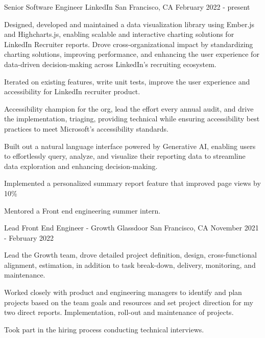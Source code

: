 

\begin{cventries}

  \cventry
    {Senior Software Engineer} %
    {LinkedIn} %
    {San Francisco, CA} %
    {February 2022 - present} %
    {
      \begin{cvitems} %
        \item {Designed, developed and maintained a data visualization library using Ember.js and Highcharts.js, enabling scalable and interactive charting solutions for LinkedIn Recruiter reports. Drove cross-organizational impact by standardizing charting solutions, improving performance, and enhancing the user experience for data-driven decision-making across LinkedIn’s recruiting ecosystem.}
        \item {Iterated on existing features, write unit tests, improve the user experience and accessibility for LinkedIn recruiter product.} 
        \item {Accessibility champion for the org, lead the effort every annual audit, and drive the implementation, triaging, providing technical while ensuring accessibility best practices to meet Microsoft's accessibility standards.} 
        \item {Built out a natural language interface powered by Generative AI, enabling users to effortlessly query, analyze, and visualize their reporting data to streamline data exploration and enhancing decision-making.}
        \item {Implemented a personalized summary report feature that improved page views by 10\%}
        \item {Mentored a Front end engineering summer intern.}
      \end{cvitems}
    }

  \cventry
    {Lead Front End Engineer - Growth} %
    {Glassdoor} %
    {San Francisco, CA} %
    {November 2021 - February 2022} %
    {
      \begin{cvitems} %
        \item {Lead the Growth team, drove detailed project definition, design, cross-functional alignment, estimation, in addition to task break-down, delivery, monitoring, and maintenance.}
        \item {Worked closely with product and engineering managers to identify and plan projects based on the team goals and resources and set project direction for my two direct reports. Implementation, roll-out and maintenance of projects.}
        \item {Took part in the hiring process conducting technical interviews.}
      \end{cvitems}
    }


\end{cventries}
